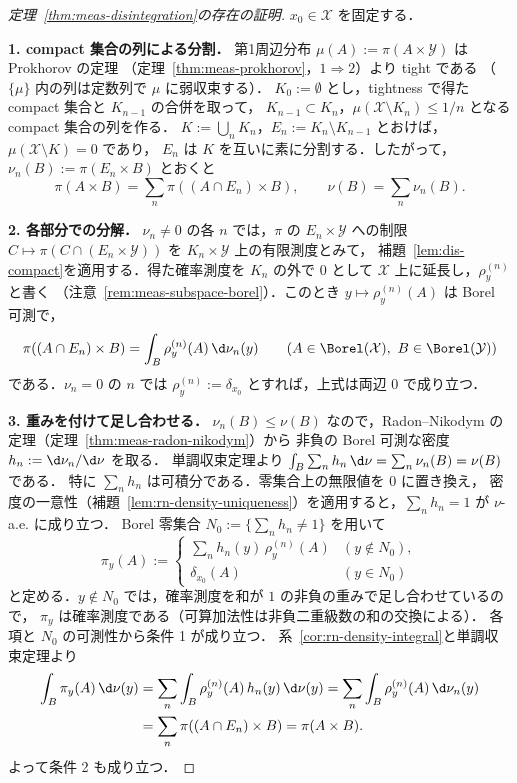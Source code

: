 \begin{proof}[定理~\ref{thm:meas-disintegration}の存在の証明]
  $x_0\in\mathcal{X}$ を固定する．

  \textbf{1. compact 集合の列による分割．}
  第1周辺分布 $\mu(A):=\pi(A\times\mathcal{Y})$ は Prokhorov の定理
  （定理~\ref{thm:meas-prokhorov}，$1\Rightarrow2$）より tight である
  （$\{\mu\}$ 内の列は定数列で $\mu$ に弱収束する）．
  $K_0:=\emptyset$ とし，tightness で得た compact 集合と $K_{n-1}$ の合併を取って，
  $K_{n-1}\subset K_n$，$\mu(\mathcal{X}\setminus K_n)\leq1/n$ となる compact 集合の列を作る．
  $K:=\bigcup_nK_n$，$E_n:=K_n\setminus K_{n-1}$ とおけば，$\mu(\mathcal{X}\setminus K)=0$ であり，
  $E_n$ は $K$ を互いに素に分割する．したがって，$\nu_n(B):=\pi(E_n\times B)$ とおくと
  \[
    \pi(A\times B)=\sum_n\pi((A\cap E_n)\times B),\qquad
    \nu(B)=\sum_n\nu_n(B).
  \]

  \textbf{2. 各部分での分解．}
  $\nu_n\neq0$ の各 $n$ では，$\pi$ の $E_n\times\mathcal{Y}$ への制限
  $C\mapsto\pi(C\cap(E_n\times\mathcal{Y}))$ を $K_n\times\mathcal{Y}$ 上の有限測度とみて，
  補題~\ref{lem:dis-compact}を適用する．得た確率測度を $K_n$ の外で $0$ として
  $\mathcal{X}$ 上に延長し，$\rho_y^{(n)}$ と書く
  （注意~\ref{rem:meas-subspace-borel}）．このとき
  $y\mapsto\rho^{(n)}_y(A)$ は Borel 可測で，
  \[
    \pi((A\cap E_n)\times B)=\int_B\rho_y^{(n)}(A)\,\d\nu_n(y)
    \qquad(A\in\Borel(\mathcal{X}),\ B\in\Borel(\mathcal{Y}))
  \]
  である．$\nu_n=0$ の $n$ では $\rho_y^{(n)}:=\delta_{x_0}$ とすれば，上式は両辺 $0$ で成り立つ．

  \textbf{3. 重みを付けて足し合わせる．}
  $\nu_n(B)\leq\nu(B)$ なので，Radon--Nikodym の定理（定理~\ref{thm:meas-radon-nikodym}）から
  非負の Borel 可測な密度 $h_n:=\d\nu_n/\d\nu$ を取る．
  単調収束定理より $\int_B\sum_nh_n\,\d\nu=\sum_n\nu_n(B)=\nu(B)$ である．
  特に $\sum_nh_n$ は可積分である．零集合上の無限値を $0$ に置き換え，
  密度の一意性（補題~\ref{lem:rn-density-uniqueness}）を適用すると，$\sum_nh_n=1$ が $\nu$-a.e. に成り立つ．
  Borel 零集合 $N_0:=\{\sum_nh_n\neq1\}$ を用いて
  \[
    \pi_y(A):=
    \begin{cases}
      \sum_nh_n(y)\,\rho_y^{(n)}(A) & (y\notin N_0),\\
      \delta_{x_0}(A) & (y\in N_0)
    \end{cases}
  \]
  と定める．$y\notin N_0$ では，確率測度を和が $1$ の非負の重みで足し合わせているので，
  $\pi_y$ は確率測度である（可算加法性は非負二重級数の和の交換による）．
  各項と $N_0$ の可測性から条件 1 が成り立つ．
  系~\ref{cor:rn-density-integral}と単調収束定理より
  \[
    \begin{aligned}
      \int_B\pi_y(A)\,\d\nu(y)
      &=\sum_n\int_B\rho_y^{(n)}(A)\,h_n(y)\,\d\nu(y)
      =\sum_n\int_B\rho_y^{(n)}(A)\,\d\nu_n(y)\\
      &=\sum_n\pi((A\cap E_n)\times B)=\pi(A\times B).
    \end{aligned}
  \]
  よって条件 2 も成り立つ．
\end{proof}

